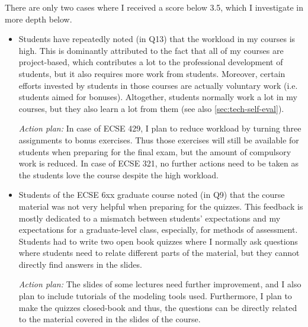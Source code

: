 \documentclass[a4paper,11pt]{report}
\begin{document}
There are only two cases where I received a score below 3.5, which I investigate in more depth below. 
\begin{itemize}
\item Students have repeatedly noted (in Q13) that the workload in my courses is high. 
This is dominantly attributed to the fact that all of my courses are project-based, which contributes a lot to the professional development of students, but it  also requires more work from students.  Moreover, certain efforts invested by students in those courses are actually voluntary work (i.e. students aimed for bonuses). Altogether, students normally work a lot in my courses, but they also learn a lot from them (see also \autoref{sec:tech-self-eval}). 

\emph{Action plan:} In case of ECSE 429, I plan to reduce workload by turning three assignments to bonus exercises. Thus those exercises will still be available for students when preparing for the final exam, but the amount of compulsory work is reduced. In case of ECSE 321, no further actions need to be taken as the students love the course despite the high workload.

\item Students of the ECSE 6xx graduate course noted (in Q9) that the course material was not very helpful when preparing for the quizzes. This feedback is mostly dedicated to a mismatch between students' expectations and my expectations for a graduate-level class, especially, for methods of assessment. Students had to write two open book quizzes where I normally ask questions where students need to relate different parts of the material, but they cannot directly find answers in the slides. 

\emph{Action plan:} The slides of some lectures need further improvement, and I also plan to include tutorials of the modeling tools used. Furthermore, I plan to make the quizzes closed-book and thus, the questions can be directly related to the material covered in the slides of the course.  

\end{itemize}
\end{document}
